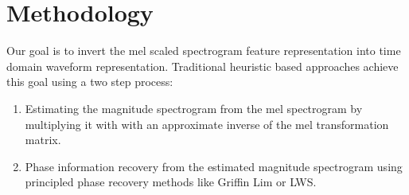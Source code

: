 \documentclass[a4paper]{article}
\begin{document}

\section{Methodology}
Our goal is to invert the mel scaled spectrogram feature representation into time domain waveform representation. 
Traditional heuristic based approaches achieve this goal using a two step process:
\begin{enumerate}
    \item Estimating the magnitude spectrogram from the mel spectrogram by multiplying it with with an approximate inverse of the mel transformation matrix.
    \item Phase information recovery from the estimated magnitude spectrogram using principled phase recovery methods like Griffin Lim\cite{griffinlim} or LWS\cite{lws}. 
\end{enumerate}
\end{document}
